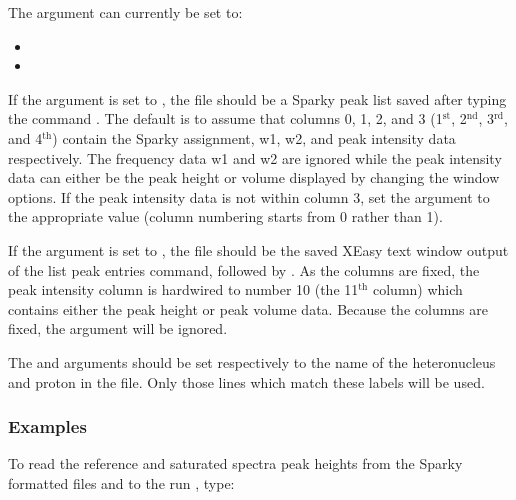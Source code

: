 The 
 argument can currently be set to:
\begin{itemize}
\item[]     
\item[]     
\end{itemize}

If the 
 argument is set to 
, the file should be a Sparky  peak list saved
after typing the command 
.  The default is to assume that columns 0, 1, 2, and 3 (1$^\mathrm{st}$,
2$^\mathrm{nd}$, 3$^\mathrm{rd}$, and 4$^\mathrm{th}$) contain the Sparky  assignment, w1, w2, and peak intensity data
respectively.  The frequency data w1 and w2 are ignored while the peak intensity data can
either be the peak height or volume displayed  by changing the window options.  If the peak
intensity data is not within column 3, set the argument 
 to the appropriate value
(column numbering starts from 0 rather than 1).

If the 
 argument is set to 
, the file should be the saved XEasy text window
output of the list peak entries command, 
 followed by 
.  As the columns are fixed,
the peak intensity column is hardwired to number 10 (the 11$^\mathrm{th}$ column) which contains either
the peak height or peak volume data.  Because the columns are fixed, the 
 argument
will be ignored.


The 
 and 
 arguments should be set respectively to the name of the
heteronucleus and proton in the file.  Only those lines which match these labels will be
used.


\subsubsection{Examples}

To read  the reference and saturated spectra peak heights from the Sparky  formatted files
 and 
 to the run 
, type:




